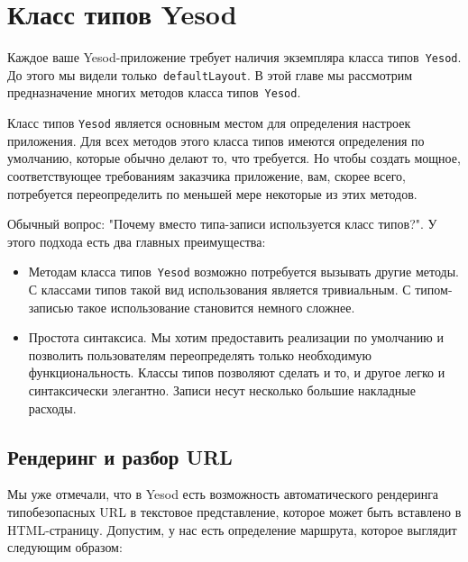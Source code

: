 \chapter {Класс типов Yesod}\label{chap:yesod-typeclass}

Каждое ваше Yesod-приложение требует наличия экземпляра класса
типов~\lstinline!Yesod!. До этого мы видели только~\lstinline!defaultLayout!. В
этой главе мы рассмотрим предназначение многих методов класса
типов~\lstinline!Yesod!.

Класс типов \lstinline!Yesod! является основным местом для определения настроек
приложения. Для всех методов этого класса типов имеются определения по
умолчанию, которые обычно делают то, что требуется. Но чтобы создать мощное,
соответствующее требованиям заказчика приложение, вам, скорее всего,
потребуется переопределить по меньшей мере некоторые из этих методов.

\begin{remark}
    Обычный вопрос: "Почему вместо типа-записи используется класс типов?". У
    этого подхода есть два главных преимущества:

    \begin{itemize}
            \item Методам класса типов~\lstinline{Yesod} возможно потребуется
                вызывать другие методы. С классами типов такой вид
                использования является тривиальным. С типом-записью такое
                использование становится немного сложнее.

            \item Простота синтаксиса. Мы хотим предоставить реализации по
                умолчанию и позволить пользователям переопределять только
                необходимую функциональность. Классы типов позволяют сделать и
                то, и другое легко и синтаксически элегантно. Записи несут
                несколько большие накладные расходы.
    \end{itemize}
\end{remark}

\section {Рендеринг и разбор URL}

Мы уже отмечали, что в Yesod есть возможность автоматического рендеринга
типобезопасных URL в текстовое представление, которое может быть вставлено в
HTML-страницу. Допустим, у нас есть определение маршрута, которое выглядит
следующим образом:

